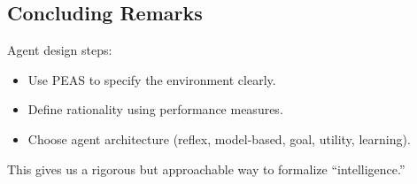 \documentclass[12pt]{article}
\theoremstyle{definition}
\begin{document}
\subsection*{Concluding Remarks}
Agent design steps:
\begin{itemize}[noitemsep]
    \item Use PEAS to specify the environment clearly.
    \item Define rationality using performance measures.
    \item Choose agent architecture (reflex, model-based, goal, utility, learning).
\end{itemize}
\noindent
This gives us a rigorous but approachable way to formalize ``intelligence.''
\end{document}
